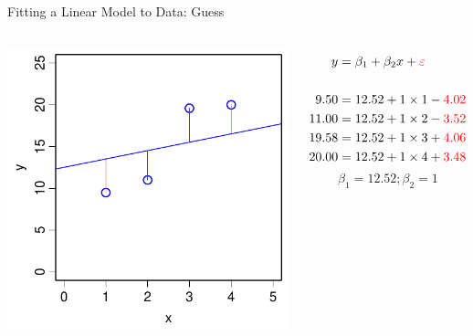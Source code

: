 \documentclass[xcolor=x11names,compress]{beamer}
\renewcommand{\(}{\begin{columns}}
\renewcommand{\)}{\end{columns}}
\newcommand{\<}[1]{\begin{column}{#1}}
\renewcommand{\>}{\end{column}}
\begin{document}

\begin{frame}{Fitting a Linear Model to Data: Guess}
    \begin{columns}[T]
   
           \includegraphics[width=\textwidth]{TooFlat.pdf}
           
           \begin{align*}
             y  &= \beta_1 + \beta_2 x  + {\color{red} \varepsilon }\\
             \\
             9.50  &= 12.52 + 1 \times 1 - {\color{red} 4.02}\\
             11.00 &= 12.52 + 1 \times 2 - {\color{red} 3.52}\\
             19.58 &= 12.52 + 1 \times 3 + {\color{red} 4.06}\\
             20.00 &= 12.52 + 1 \times 4 + {\color{red} 3.48} 
           \end{align*}
           \[\beta_1 = 12.52; \beta_2=1\]
   
   \end{columns}
   \end{frame}
\end{document}
